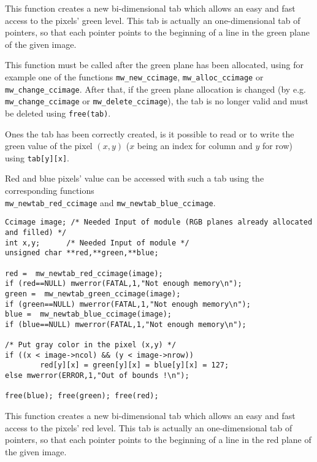 \newpage %
\Description
This function creates a new bi-dimensional tab which allows an easy and fast
access to the pixels' green level.
This tab is actually an one-dimensional tab of pointers, so that each pointer 
points to the beginning of a line in the green plane of the given image.

This function must be called after the green plane has been allocated,
using for example one of the functions \verb+mw_new_ccimage+, 
\verb+mw_alloc_ccimage+ or \verb+mw_change_ccimage+. 
After that, if the green plane allocation is changed
(by e.g. \verb+mw_change_ccimage+ or \verb+mw_delete_ccimage+), the tab is
no longer valid and must be deleted using \verb+free(tab)+.

Ones the tab has been correctly created, is it possible to read or to
write the green value of the pixel $(x,y)$ ($x$ being an index for column and $y$
for row) using \verb+tab[y][x]+.

Red and blue pixels' value can be accessed with such a tab using 
the corresponding functions \\
\verb+mw_newtab_red_ccimage+ and \verb+mw_newtab_blue_ccimage+.

\Next
\Example
\begin{verbatim}
Ccimage image; /* Needed Input of module (RGB planes already allocated and filled) */
int x,y;      /* Needed Input of module */
unsigned char **red,**green,**blue;

red =  mw_newtab_red_ccimage(image);
if (red==NULL) mwerror(FATAL,1,"Not enough memory\n");
green =  mw_newtab_green_ccimage(image);
if (green==NULL) mwerror(FATAL,1,"Not enough memory\n");
blue =  mw_newtab_blue_ccimage(image);
if (blue==NULL) mwerror(FATAL,1,"Not enough memory\n");

/* Put gray color in the pixel (x,y) */
if ((x < image->ncol) && (y < image->nrow)) 
        red[y][x] = green[y][x] = blue[y][x] = 127;
else mwerror(ERROR,1,"Out of bounds !\n");

free(blue); free(green); free(red);
\end{verbatim}

\newpage %
\Description
This function creates a new bi-dimensional tab which allows an easy and fast
access to the pixels' red level.
This tab is actually an one-dimensional tab of pointers, so that each pointer 
points to the beginning of a line in the red plane of the given image.

